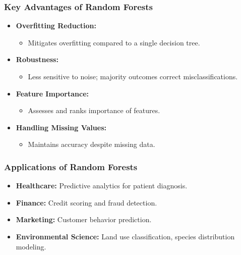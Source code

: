 \documentclass[aspectratio=169]{beamer}
\begin{document}
\begin{frame}
    \frametitle{Key Advantages of Random Forests}
    \begin{itemize}
        \item \textbf{Overfitting Reduction:}
            \begin{itemize}
                \item Mitigates overfitting compared to a single decision tree.
            \end{itemize}
        \item \textbf{Robustness:}
            \begin{itemize}
                \item Less sensitive to noise; majority outcomes correct misclassifications.
            \end{itemize}
        \item \textbf{Feature Importance:}
            \begin{itemize}
                \item Assesses and ranks importance of features.
            \end{itemize}
        \item \textbf{Handling Missing Values:}
            \begin{itemize}
                \item Maintains accuracy despite missing data.
            \end{itemize}
    \end{itemize}
\end{frame}

\begin{frame}
    \frametitle{Applications of Random Forests}
    \begin{itemize}
        \item \textbf{Healthcare:} Predictive analytics for patient diagnosis.
        \item \textbf{Finance:} Credit scoring and fraud detection.
        \item \textbf{Marketing:} Customer behavior prediction.
        \item \textbf{Environmental Science:} Land use classification, species distribution modeling.
    \end{itemize}
\end{frame}
\end{document}
